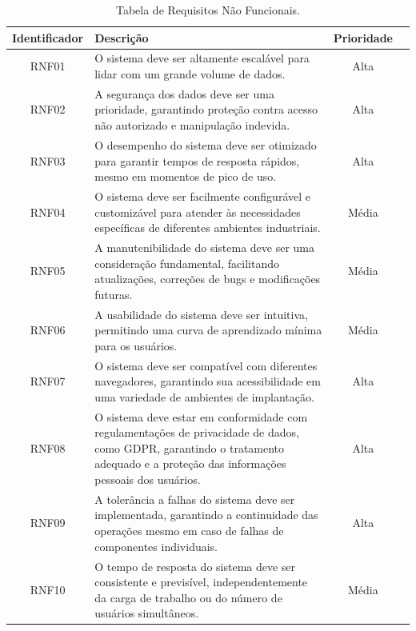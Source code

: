 \begin{table}[htbp]
\centering
\begin{tabularx}{\linewidth}{|c|X|c|c|} \hline
\rowcolor[HTML]{C0C0C0} 
    \textbf{Identificador} & \textbf{Descrição} & \textbf{Prioridade} \\
    \hline
    RNF01 & O sistema deve ser altamente escalável para lidar com um grande volume de dados. & Alta \\
    \hline
    RNF02 & A segurança dos dados deve ser uma prioridade, garantindo proteção contra acesso não autorizado e manipulação indevida. & Alta \\
    \hline
    RNF03 & O desempenho do sistema deve ser otimizado para garantir tempos de resposta rápidos, mesmo em momentos de pico de uso. & Alta \\
    \hline
    RNF04 & O sistema deve ser facilmente configurável e customizável para atender às necessidades específicas de diferentes ambientes industriais. & Média \\
    \hline
    RNF05 & A manutenibilidade do sistema deve ser uma consideração fundamental, facilitando atualizações, correções de bugs e modificações futuras. & Média \\
    \hline
    RNF06 & A usabilidade do sistema deve ser intuitiva, permitindo uma curva de aprendizado mínima para os usuários. & Média \\
    \hline
    RNF07 & O sistema deve ser compatível com diferentes navegadores, garantindo sua acessibilidade em uma variedade de ambientes de implantação. & Alta \\
    \hline
    RNF08 & O sistema deve estar em conformidade com regulamentações de privacidade de dados, como GDPR, garantindo o tratamento adequado e a proteção das informações pessoais dos usuários. & Alta \\
    \hline
    RNF09 & A tolerância a falhas do sistema deve ser implementada, garantindo a continuidade das operações mesmo em caso de falhas de componentes individuais. & Alta \\
    \hline
    RNF10 & O tempo de resposta do sistema deve ser consistente e previsível, independentemente da carga de trabalho ou do número de usuários simultâneos. & Média \\
    \hline
\end{tabularx}
\caption{Tabela de Requisitos Não Funcionais.}
\label{tab:ReqNaoFuncional}
\end{table}

